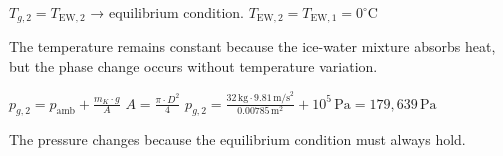 \( T_{g,2} = T_{\text{EW},2} \) → equilibrium condition.  
\( T_{\text{EW},2} = T_{\text{EW},1} = 0^\circ \text{C} \)  

The temperature remains constant because the ice-water mixture absorbs heat, but the phase change occurs without temperature variation.  

\( p_{g,2} = p_{\text{amb}} + \frac{m_K \cdot g}{A} \)  
\( A = \frac{\pi \cdot D^2}{4} \)  
\( p_{g,2} = \frac{32 \, \text{kg} \cdot 9.81 \, \text{m/s}^2}{0.00785 \, \text{m}^2} + 10^5 \, \text{Pa} = 179,639 \, \text{Pa} \)  

The pressure changes because the equilibrium condition must always hold.